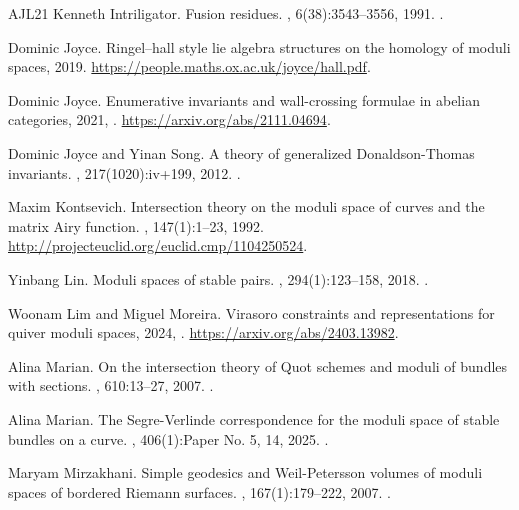 \documentclass[11pt]{amsart}
\theoremstyle{remark}
\numberwithin{theorem}{section}
\begin{document}
\begin{thebibliography}{AJL{\etalchar{+}}21}
Kenneth Intriligator.
\newblock Fusion residues.
, 6(38):3543--3556, 1991.
\newblock {}.

Dominic Joyce.
\newblock Ringel–hall style lie algebra structures on the homology of moduli
  spaces, 2019.
\newblock \urlprefix\url{https://people.maths.ox.ac.uk/joyce/hall.pdf}.

Dominic Joyce.
\newblock Enumerative invariants and wall-crossing formulae in abelian
  categories, 2021, .
\newblock \urlprefix\url{https://arxiv.org/abs/2111.04694}.

Dominic Joyce and Yinan Song.
\newblock A theory of generalized {D}onaldson-{T}homas invariants.
, 217(1020):iv+199, 2012.
\newblock {}.

Maxim Kontsevich.
\newblock Intersection theory on the moduli space of curves and the matrix
  {A}iry function.
, 147(1):1--23, 1992.
\newblock \urlprefix\url{http://projecteuclid.org/euclid.cmp/1104250524}.

Yinbang Lin.
\newblock Moduli spaces of stable pairs.
, 294(1):123--158, 2018.
\newblock {}.

Woonam Lim and Miguel Moreira.
\newblock Virasoro constraints and representations for quiver moduli spaces,
  2024, .
\newblock \urlprefix\url{https://arxiv.org/abs/2403.13982}.

Alina Marian.
\newblock On the intersection theory of {Q}uot schemes and moduli of bundles
  with sections.
, 610:13--27, 2007.
\newblock {}.

Alina Marian.
\newblock The {S}egre-{V}erlinde correspondence for the moduli space of stable
  bundles on a curve.
, 406(1):Paper No. 5, 14, 2025.
\newblock {}.

Maryam Mirzakhani.
\newblock Simple geodesics and {W}eil-{P}etersson volumes of moduli spaces of
  bordered {R}iemann surfaces.
, 167(1):179--222, 2007.
\newblock {}.


\end{thebibliography}
\end{document}
